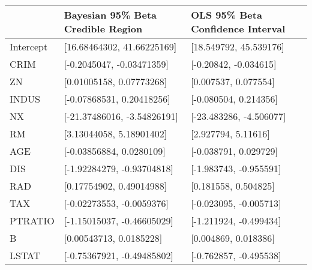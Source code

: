 \begin{tabular}{lll}
\hline
           & Bayesian 95\% Beta Credible Region   & OLS 95\% Beta Confidence Interval   \\
\hline
 Intercept & [16.68464302, 41.66225169]          & [18.549792, 45.539176]             \\
 CRIM      & [-0.2045047, -0.03471359]           & [-0.20842, -0.034615]              \\
 ZN        & [0.01005158, 0.07773268]            & [0.007537, 0.077554]               \\
 INDUS     & [-0.07868531, 0.20418256]           & [-0.080504, 0.214356]              \\
 NX        & [-21.37486016, -3.54826191]         & [-23.483286, -4.506077]            \\
 RM        & [3.13044058, 5.18901402]            & [2.927794, 5.11616]                \\
 AGE       & [-0.03856884, 0.0280109]            & [-0.038791, 0.029729]              \\
 DIS       & [-1.92284279, -0.93704818]          & [-1.983743, -0.955591]             \\
 RAD       & [0.17754902, 0.49014988]            & [0.181558, 0.504825]               \\
 TAX       & [-0.02273553, -0.0059376]           & [-0.023095, -0.005713]             \\
 PTRATIO   & [-1.15015037, -0.46605029]          & [-1.211924, -0.499434]             \\
 B         & [0.00543713, 0.0185228]             & [0.004869, 0.018386]               \\
 LSTAT     & [-0.75367921, -0.49485802]          & [-0.762857, -0.495538]             \\
\hline
\end{tabular}